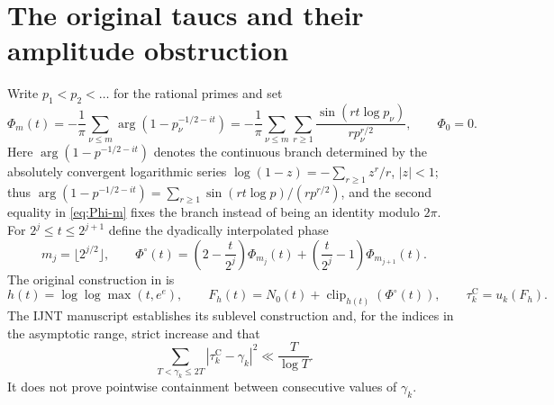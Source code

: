 \documentclass[11pt,a4paper]{article}
\numberwithin{equation}{section}
\theoremstyle{definition}
\theoremstyle{remark}
\newcommand{\clip}{\operatorname{clip}}
\begin{document}
\section{The original taucs and their amplitude obstruction}\label{sec:original}
Write $p_1<p_2<\dots$ for the rational primes and set
\begin{equation}\label{eq:Phi-m}
\Phi_m(t)=-\frac1\pi\sum_{\nu\le m}\arg(1-p_\nu^{-1/2-it})
=-\frac1\pi\sum_{\nu\le m}\sum_{r\ge1}
 \frac{\sin(rt\log p_\nu)}{r p_\nu^{r/2}},\qquad \Phi_0=0.
\end{equation}
Here $\arg(1-p^{-1/2-it})$ denotes the continuous branch determined by the absolutely convergent logarithmic series $\log(1-z)=-\sum_{r\ge1}z^r/r$, $|z|<1$; thus $\arg(1-p^{-1/2-it})=\sum_{r\ge1}\sin(rt\log p)/(rp^{r/2})$, and the second equality in \eqref{eq:Phi-m} fixes the branch instead of being an identity modulo $2\pi$.
For $2^j\le t\le2^{j+1}$ define the dyadically interpolated phase
\begin{equation}\label{eq:interpolation}
m_j=\lfloor2^{j/2}\rfloor,\qquad
\Phi^\circ(t)=\left(2-\frac{t}{2^j}\right)\Phi_{m_j}(t)
 +\left(\frac{t}{2^j}-1\right)\Phi_{m_{j+1}}(t).
\end{equation}
The original construction in \cite{CasanaIJNT} is
\begin{equation}\label{eq:old}
h(t)=\log\log\max(t,e^e),\qquad
F_h(t)=N_0(t)+\clip_{h(t)}(\Phi^\circ(t)),\qquad
\tau_k^{\mathrm C}=u_k(F_h).
\end{equation}
The IJNT manuscript establishes its sublevel construction and, for the indices in the asymptotic range, strict increase and that
\begin{equation}\label{eq:oldMS}
\sum_{T<\gamma_k\le2T}|\tau_k^{\mathrm C}-\gamma_k|^2\ll\frac{T}{\log T}.
\end{equation}
It does not prove pointwise containment between consecutive values of $\gamma_k$.
\end{document}
